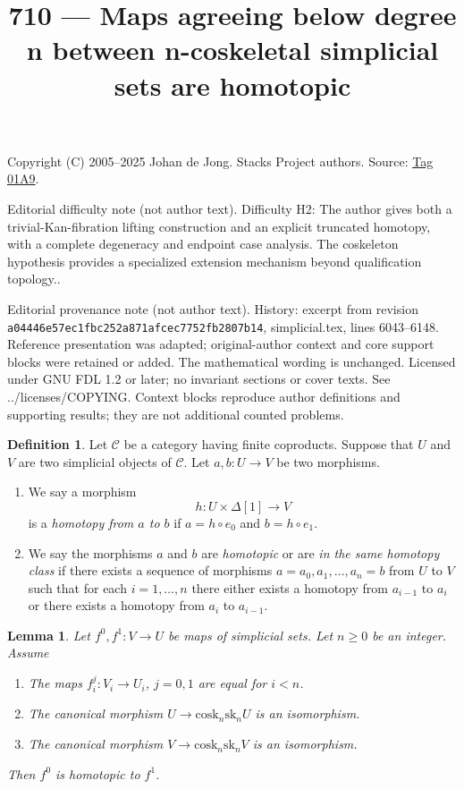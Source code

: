 \documentclass{amsart}
\theoremstyle{plain}
\newtheorem{lemma}[subsection]{Lemma}
\theoremstyle{definition}
\newtheorem{definition}[subsection]{Definition}
\theoremstyle{remark}
\numberwithin{equation}{subsection}
\begin{document}
\title[Stacks Project, Tag 01A9]{710 --- Maps agreeing below degree n between n-coskeletal simplicial sets are homotopic}
\maketitle
\noindent Copyright (C) 2005--2025 Johan de Jong. Stacks Project authors. Source: \href{https://stacks.math.columbia.edu/tag/01A9}{Tag 01A9}.

\noindent Editorial difficulty note (not author text). Difficulty H2: The author gives both a trivial-Kan-fibration lifting construction and an explicit truncated homotopy, with a complete degeneracy and endpoint case analysis. The coskeleton hypothesis provides a specialized extension mechanism beyond qualification topology..

\noindent Editorial provenance note (not author text). History: excerpt from revision \texttt{a0444\allowbreak 6e57e\allowbreak c1fbc\allowbreak 252a8\allowbreak 71afc\allowbreak ec775\allowbreak 2fb28\allowbreak 07b14}, simplicial.tex, lines 6043--6148. Reference presentation was adapted; original-author context and core support blocks were retained or added. The mathematical wording is unchanged. Licensed under GNU FDL 1.2 or later; no invariant sections or cover texts. See ../licenses/COPYING. Context blocks reproduce author definitions and supporting results; they are not additional counted problems.

\begin{definition}
\label{definition-homotopy}
Let $\mathcal{C}$ be a category having finite coproducts.
Suppose that $U$ and $V$ are two simplicial objects of $\mathcal{C}$.
Let $a, b : U \to V$ be two morphisms.
\begin{enumerate}
\item We say a morphism
$$
h : U \times \Delta[1] \longrightarrow V
$$
is a {\it homotopy from $a$ to $b$} if $a = h \circ e_0$ and
$b = h \circ e_1$.
\item We say the morphisms $a$ and $b$ are {\it homotopic} or are
{\it in the same homotopy class}
if there exists a sequence of morphisms $a = a_0, a_1, \ldots, a_n = b$
from $U$ to $V$ such that for each $i = 1, \ldots, n$ there either exists
a homotopy from $a_{i - 1}$ to $a_i$ or there exists a homotopy
from $a_i$ to $a_{i - 1}$.
\end{enumerate}
\end{definition}

\begin{lemma}
\label{lemma-homotopy}
Let $f^0, f^1 : V \to U$ be maps of simplicial sets.
Let $n \geq 0$ be an integer.
Assume
\begin{enumerate}
\item The maps $f^j_i : V_i \to U_i$, $j = 0, 1$ are equal for $i < n$.
\item The canonical morphism $U \to \text{cosk}_n \text{sk}_n U$
is an isomorphism.
\item The canonical morphism $V \to \text{cosk}_n \text{sk}_n V$
is an isomorphism.
\end{enumerate}
Then $f^0$ is homotopic to $f^1$.
\end{lemma}
\end{document}

